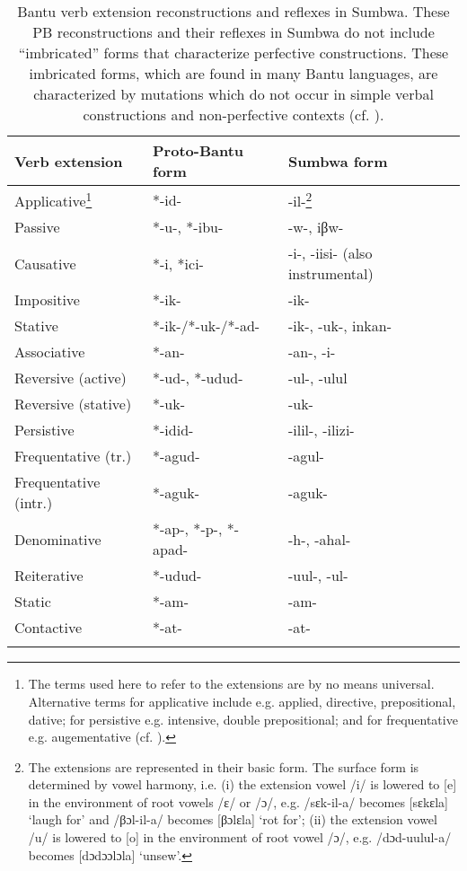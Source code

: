 \documentclass[output=paper		  ]{langscibook}
\begin{document}
\begin{table}
\begin{tabularx}{\textwidth}{llQ}
\lsptoprule
{Verb extension}  & {Proto-Bantu form} & {Sumbwa form}\\
\midrule
 {Applicative}\footnote{The terms used here to refer to the extensions are by no means universal. Alternative terms for applicative include e.g. applied, directive, prepositional, dative; for persistive e.g. intensive, double prepositional; and for frequentative e.g. augementative (cf. \citealt{Madan1903, Johnson1939, Ashton1947, Guthrie1962, Lodhi2002, Schadeberg2003}).} & *-id- & {{{}-il-}\footnote{The extensions are represented in their basic form. The surface form is determined by vowel harmony, i.e. (i) the extension vowel /i/ is lowered to [e] in the environment of root vowels /ε/ or /ɔ/, e.g. /sεk-il-a/ becomes [sεkεla] ‘laugh for’ and /βɔl-il-a/ becomes [βɔlεla] ‘rot for’; (ii) the extension vowel /u/ is lowered to [o] in the environment of root vowel /ɔ/, e.g. /dɔd-uulul-a/ becomes [dɔdɔɔlɔla] ‘unsew’.}}\\
Passive & *-u-, *-ibu- & {}-w-, iβw-\\
{{Causative}} & *-i, *ici- & {{{}-i-, -iisi- (also instrumental)}}\\
Impositive & {{*-ik-}} & {}-ik-\\
Stative & *-ik-/*-uk-/*-ad- & {}-ik-, -uk-, inkan-\\
Associative & *-an- & {}-an-, -i-\\
Reversive (active) & *-ud-, *-udud- & {}-ul-, -ulul\\
Reversive (stative) & *-uk- & {}-uk-\\
Persistive & {{*-idid-}} & {{{}-ilil-, -ilizi-}}\\
Frequentative (tr.) & *-agud- & {}-agul-\\
{{Frequentative (intr.)}} & *-aguk- & {}-aguk-\\
Denominative & *-ap-, *-p-, *-apad- & {}-h-, -ahal-\\
Reiterative & *-udud- & {}-uul-, -ul-\\
Static & *-am- & {}-am-\\
Contactive & *-at- & {}-at-\\
\lspbottomrule
\end{tabularx}
\caption{Bantu verb extension reconstructions and reflexes in Sumbwa. These PB reconstructions and their reflexes in Sumbwa do not include “imbricated” forms that characterize perfective constructions. These imbricated forms, which are found in many Bantu languages, are characterized by mutations which do not occur in simple verbal constructions and non-perfective contexts (cf. \citealt{Berger1937-8, Givón1970, Mould1972, Bastin1983, Kahigi1989, Hyman1995, Kula2001}).}
\label{tab:kahigi:1}
\end{table}
\end{document}

